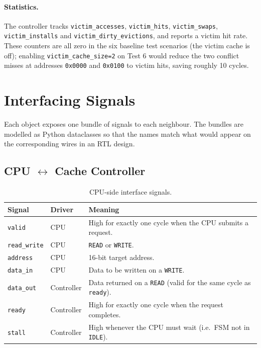 \documentclass[11pt,a4paper]{article}
\begin{document}
\paragraph{Statistics.} The controller tracks \texttt{victim\_accesses},
\texttt{victim\_hits}, \texttt{victim\_swaps}, \texttt{victim\_installs} and
\texttt{victim\_dirty\_evictions}, and reports a victim hit rate. These
counters are all zero in the six baseline test scenarios (the victim cache is
off); enabling \texttt{victim\_cache\_size=2} on Test 6 would reduce the two
conflict misses at addresses \texttt{0x0000} and \texttt{0x0100} to victim
hits, saving roughly 10 cycles.

\section{Interfacing Signals}\label{sec:sig}

Each object exposes one bundle of signals to each neighbour. The bundles are
modelled as Python dataclasses so that the names match what would appear on
the corresponding wires in an RTL design.

\subsection{CPU $\leftrightarrow$ Cache Controller}

\begin{table}[h]
    \centering
    \caption{CPU-side interface signals.}
    \begin{tabularx}{\linewidth}{@{}llX@{}}
        \toprule
        \textbf{Signal} & \textbf{Driver} & \textbf{Meaning} \\
        \midrule
        \texttt{valid}      & CPU        & High for exactly one cycle when the CPU submits a request. \\
        \texttt{read\_write}& CPU        & \texttt{READ} or \texttt{WRITE}. \\
        \texttt{address}    & CPU        & 16-bit target address. \\
        \texttt{data\_in}   & CPU        & Data to be written on a \texttt{WRITE}. \\
        \texttt{data\_out}  & Controller & Data returned on a \texttt{READ} (valid for the same cycle as \texttt{ready}). \\
        \texttt{ready}      & Controller & High for exactly one cycle when the request completes. \\
        \texttt{stall}      & Controller & High whenever the CPU must wait (i.e.\ FSM not in \texttt{IDLE}). \\
        \bottomrule
    \end{tabularx}
\end{table}
\end{document}
